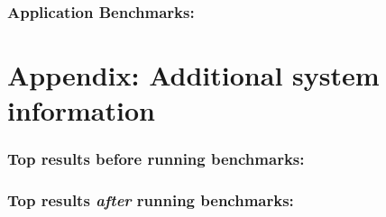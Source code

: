 \documentclass{article}
\begin{document}
\subsubsection*{Application Benchmarks:}
{\footnotesize
%


}


\section{Appendix: Additional system information}

\subsubsection*{Top results before running benchmarks:}
{
\footnotesize

}
\subsubsection*{Top results {\em after} running benchmarks:}
{
\footnotesize

}
\end{document}
